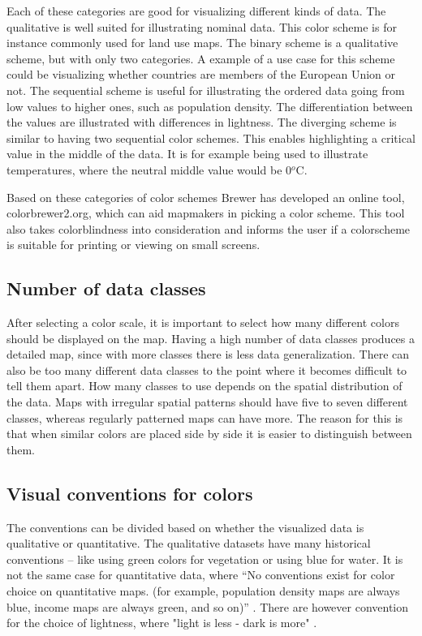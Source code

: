 Each of these categories are good for visualizing different kinds of data. The qualitative is well suited for illustrating nominal data. This color scheme is for instance commonly used for land use maps. The binary scheme is a qualitative scheme, but with only two categories. A example of a use case for this scheme could be visualizing whether countries are members of the European Union or not. 
The sequential scheme is useful for illustrating the ordered data going from low values to higher ones, such as population density. The differentiation between the values are illustrated with differences in lightness.
The diverging scheme is similar to having two sequential color schemes. This enables highlighting a critical value in the middle of the data. It is for example being used to illustrate temperatures, where the neutral middle value would be 0$^o$C. \citep{Brewer94}


Based on these categories of color schemes Brewer has developed an online tool, colorbrewer2.org, which can aid mapmakers in picking a color scheme. This tool also takes colorblindness into consideration and informs the user if a colorscheme is suitable for printing or viewing on small screens. \citep{ColorBrewer}

\subsection{Number of data classes}
After selecting a color scale, it is important to select how many different colors should be displayed on the map. Having a high number of data classes produces a detailed map, since with more classes there is less data generalization. There can also be too many different data classes to the point where it becomes difficult to tell them apart. 
How many classes to use depends on the spatial distribution of the data. Maps with irregular spatial patterns should have five to seven different classes, whereas regularly patterned maps can have more. The reason for this is that when similar colors are placed side by side it is easier to distinguish between them.\citep{ColorBrewer}

\subsection{Visual conventions for colors}
The conventions can be divided based on whether the visualized data is qualitative or quantitative. The qualitative datasets have many historical conventions – like using green colors for vegetation or using blue for water. 
It is not the same case for quantitative data, where “No conventions exist for color choice on quantitative maps. (for example, population density maps are always blue, income maps are always green, and so on)” \citep{Dent}. There are however convention for the choice of lightness, where "light is less - dark is more" \citep{LightIsLess}. %





